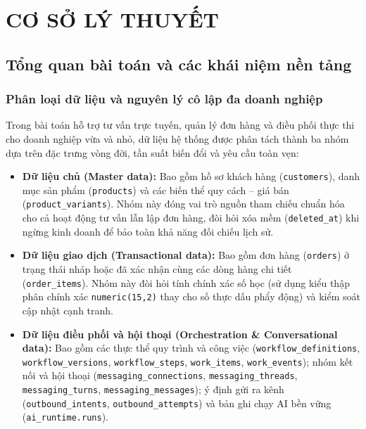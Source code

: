 \chapter{CƠ SỞ LÝ THUYẾT}\label{chap:background}

\section{Tổng quan bài toán và các khái niệm nền tảng}

\subsection{Phân loại dữ liệu và nguyên lý cô lập đa doanh nghiệp}
Trong bài toán hỗ trợ tư vấn trực tuyến, quản lý đơn hàng và điều phối thực thi cho doanh nghiệp vừa và nhỏ, dữ liệu hệ thống được phân tách thành ba nhóm dựa trên đặc trưng vòng đời, tần suất
biến đổi và yêu cầu toàn vẹn:
\begin{itemize}
  \item \textbf{Dữ liệu chủ (Master data):} Bao gồm hồ sơ khách hàng (\texttt{customers}), danh mục sản phẩm (\texttt{products}) và các biến thể quy cách -- giá bán (\texttt{product\_\hspace{0pt}variants}).
    Nhóm này đóng vai trò nguồn tham chiếu chuẩn hóa cho cả hoạt động tư vấn lẫn lập đơn hàng, đòi hỏi xóa mềm (\texttt{deleted\_\hspace{0pt}at}) khi ngừng kinh doanh để bảo toàn khả năng đối chiếu lịch sử.
  \item \textbf{Dữ liệu giao dịch (Transactional data):} Bao gồm đơn hàng (\texttt{orders}) ở trạng thái nháp hoặc đã xác nhận cùng các dòng hàng chi tiết (\texttt{order\_\hspace{0pt}items}). Nhóm này đòi
    hỏi tính chính xác số học (sử dụng kiểu thập phân chính xác \texttt{numeric(15,2)} thay cho số thực dấu phẩy động) và kiểm soát cập nhật cạnh tranh.
  \item \textbf{Dữ liệu điều phối và hội thoại (Orchestration \& Conversational data):} Bao gồm các thực thể quy trình và công việc
    (\texttt{workflow\_\hspace{0pt}definitions}, \texttt{workflow\_\hspace{0pt}versions}, \texttt{workflow\_\hspace{0pt}steps}, \texttt{work\_\hspace{0pt}items}, \texttt{work\_\hspace{0pt}events});
    nhóm kết nối và hội thoại (\texttt{messaging\_\hspace{0pt}connections}, \texttt{messaging\_\hspace{0pt}threads}, \texttt{messaging\_\hspace{0pt}turns}, \texttt{messaging\_\hspace{0pt}messages});
    ý định gửi ra kênh (\texttt{outbound\_\hspace{0pt}intents}, \texttt{outbound\_\hspace{0pt}attempts}) và bản ghi chạy AI bền vững (\texttt{ai\_\hspace{0pt}runtime.\hspace{0pt}runs}).
\end{itemize}

